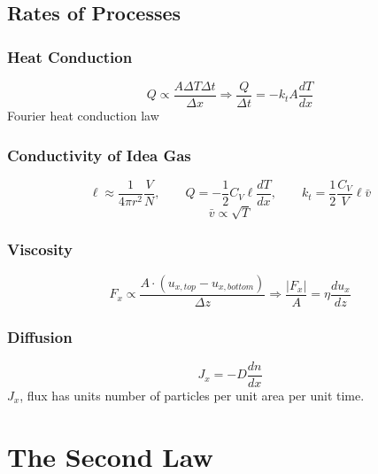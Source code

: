 \documentclass[a4paper,norsk, 10pt]{article}
\begin{document}
\subsection{Rates of Processes}
\subsubsection{Heat Conduction}
\begin{equation}
Q \propto \frac{A\Delta T\Delta t}{\Delta x} \Rightarrow \frac{Q}{\Delta t} = -k_t A \frac{dT}{dx}
\end{equation}
Fourier heat conduction law
\subsubsection{Conductivity of Idea Gas}
\begin{equation}
\ell \approx \frac{1}{4\pi r^2}\frac{V}{N},\qquad Q = -\frac{1}{2}C_V\ell \frac{dT}{dx}, \qquad k_t = \frac{1}{2}\frac{C_V}{V}\ell \bar{v}
\end{equation}
\begin{equation}
\bar{v}\propto \sqrt{T}
\end{equation}

\subsubsection{Viscosity}
\begin{equation}
F_x \propto \frac{A\cdot (u_{x,top}- u_{x,bottom})}{\Delta z} \Rightarrow \frac{|F_x|}{A} = \eta \frac{du_x}{dz}
\end{equation}

\subsubsection{Diffusion}
\begin{equation}
J_x = -D\frac{dn}{dx}
\end{equation}
$J_x$, flux has units number of particles per unit area per unit time.

\section{The Second Law}
\end{document}
